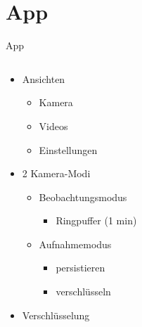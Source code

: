 \documentclass[19pt]{beamer}
\begin{document}
\section{App}
\begin{frame}{App}
  \begin{columns}[T]
    \begin{column}{.5\textwidth}
    		\begin{itemize}
    			\item Ansichten
			\begin{itemize}
				\item Kamera
				\item Videos
				\item Einstellungen
				\pause
			\end{itemize}
			\item 2 Kamera-Modi
			\begin{itemize}
				\item Beobachtungsmodus
				\begin{itemize}
					\item Ringpuffer (1 min)
				\end{itemize}
				\item Aufnahmemodus
				\begin{itemize}
					\item persistieren
					\item verschl\"usseln
				\end{itemize}
				\pause
			\end{itemize}
			\item Verschl\"usselung
    		\end{itemize}
    \end{column}
    \begin{column}{.5\textwidth}
    \end{column}
  \end{columns}
\end{frame}
\end{document}
